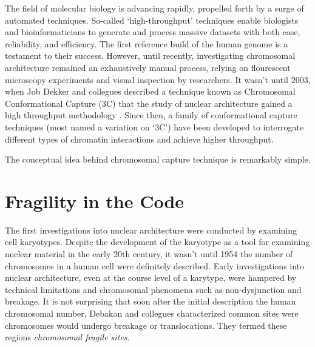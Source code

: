 \documentclass[phd,tocprelim]{cornell}
\begin{document}
The field of molecular biology is advancing rapidly, propelled forth by a
surge of automated techniques.  So-called `high-throughput' techniques enable
biologists and bioinformaticians to generate and process massive datasets with
both ease, reliability, and efficiency.  The first reference build of the
human genome is a testament to their success\cite{hgsc2004}.  However,
until recently, investigating chromosomal architecture remained an
exhaustively manual process, relying on flourescent microscopy experiments and
visual inspection by researchers.  It wasn't until 2003, when Job Dekker and
collegues described a technique known as Chromosomal Conformational Capture
(3C) that the study of nuclear architecture gained a high throughput methodology
\cite{dekker2002}. Since then, a family of conformational capture techniques
(most named a variation on `3C') have been developed to interrogate
different types of chromatin interactions and achieve higher throughput.

The conceptual idea behind chromosomal capture technique is remarkably simple.





















\chapter{Fragility in the Code}

The first investigations into nuclear architecture were conducted by
examining cell karyotypes.  Despite the development of the karyotype as a
tool for examining nuclear material in the early 20th
century\cite{levitsky1924}, it wasn't until 1954 the number of chromosomes in
a human cell were definitely described\cite{tjio1956}.  Early investigations
into nuclear architecture, even at the course level of a karytype, were
hampered by technical limitations and chromosomal phenomena such as
non-dysjunction and breakage.  It is not surprising that soon after the
initial description the human chromosomal number, Debakan and collegues
characterized common sites were chromosomes would undergo breakage or
translocations.  They termed these regions
\textit{chromosomal fragile sites}\cite{leyden2008}.
\end{document}
